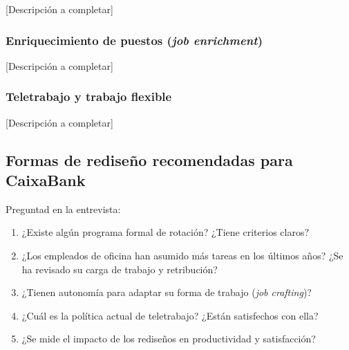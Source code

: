 [Descripción a completar]

\subsubsection{Enriquecimiento de puestos (\textit{job enrichment})}


[Descripción a completar]

\subsubsection{Teletrabajo y trabajo flexible}


[Descripción a completar]

\subsection{Formas de rediseño recomendadas para CaixaBank}


\begin{notaequipo}
  Preguntad en la entrevista:
  \begin{enumerate}
    \item ¿Existe algún programa formal de rotación? ¿Tiene criterios claros?
    \item ¿Los empleados de oficina han asumido más tareas en los últimos años?
          ¿Se ha revisado su carga de trabajo y retribución?
    \item ¿Tienen autonomía para adaptar su forma de trabajo (\textit{job crafting})?
    \item ¿Cuál es la política actual de teletrabajo? ¿Están satisfechos con ella?
    \item ¿Se mide el impacto de los rediseños en productividad y satisfacción?
  \end{enumerate}
\end{notaequipo}
